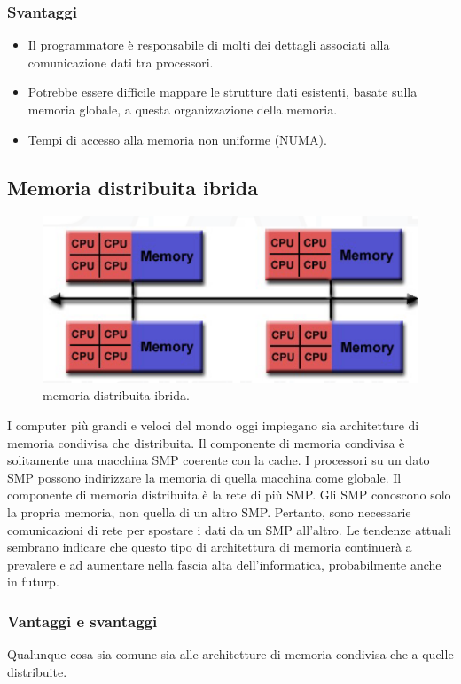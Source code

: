 \subsubsection*{Svantaggi}
\begin{itemize}
	\item Il programmatore è responsabile di molti dei dettagli associati alla comunicazione dati tra processori.
	\item Potrebbe essere difficile mappare le strutture dati esistenti, basate sulla memoria globale, a questa organizzazione della memoria.
	\item Tempi di accesso alla memoria non uniforme (NUMA).
\end{itemize}
\clearpage
\subsection{Memoria distribuita ibrida}
\begin{figure}[th]
	\centering
	\includegraphics[width=0.7\linewidth]{img/memoria-distribuita-ibrida}
	\caption{memoria distribuita ibrida.}
	\label{fig:memoria-distribuita-ibrida}
\end{figure}
I computer più grandi e veloci del mondo oggi impiegano sia architetture di memoria condivisa che distribuita. Il componente di memoria condivisa è solitamente una macchina SMP coerente con la cache. I processori su un dato SMP possono indirizzare la memoria di quella macchina come globale. Il componente di memoria distribuita è la rete di più SMP.
Gli SMP conoscono solo la propria memoria, non quella di un altro
SMP. Pertanto, sono necessarie comunicazioni di rete per spostare i dati da
un SMP all'altro.
 Le tendenze attuali sembrano indicare che questo tipo di architettura di memoria continuerà a prevalere e ad aumentare nella fascia alta dell'informatica, probabilmente anche in futurp.
\subsubsection*{Vantaggi e svantaggi}Qualunque cosa sia comune sia alle architetture di memoria condivisa che a quelle distribuite.


